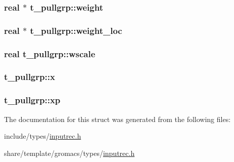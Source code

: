 \hypertarget{structt__pullgrp_a8ac8ef990664637ad9b3c2136fa4be33}{
\subsubsection[{weight}]{\setlength{\rightskip}{0pt plus 5cm}real $\ast$ {\bf t\-\_\-pullgrp\-::weight}}}\label{structt__pullgrp_a8ac8ef990664637ad9b3c2136fa4be33}
\hypertarget{structt__pullgrp_a2c0438fc7f0bcf6b4b41c5a9ad902178}{
\subsubsection[{weight\-\_\-loc}]{\setlength{\rightskip}{0pt plus 5cm}real $\ast$ {\bf t\-\_\-pullgrp\-::weight\-\_\-loc}}}\label{structt__pullgrp_a2c0438fc7f0bcf6b4b41c5a9ad902178}
\hypertarget{structt__pullgrp_ae601169dc37b101a82222faf0cc27d8b}{
\subsubsection[{wscale}]{\setlength{\rightskip}{0pt plus 5cm}real {\bf t\-\_\-pullgrp\-::wscale}}}\label{structt__pullgrp_ae601169dc37b101a82222faf0cc27d8b}
\hypertarget{structt__pullgrp_a63b5fda8c71a89eb2edc706ec10a56f9}{
\subsubsection[{x}]{ {\bf t\-\_\-pullgrp\-::x}}}\label{structt__pullgrp_a63b5fda8c71a89eb2edc706ec10a56f9}
\hypertarget{structt__pullgrp_a20e6a8dbf9e5efc15838d951f12a9562}{
\subsubsection[{xp}]{ {\bf t\-\_\-pullgrp\-::xp}}}\label{structt__pullgrp_a20e6a8dbf9e5efc15838d951f12a9562}


\-The documentation for this struct was generated from the following files\-:\begin{DoxyCompactItemize}
\item 
include/types/\hyperlink{include_2types_2inputrec_8h}{inputrec.\-h}\item 
share/template/gromacs/types/\hyperlink{share_2template_2gromacs_2types_2inputrec_8h}{inputrec.\-h}\end{DoxyCompactItemize}
